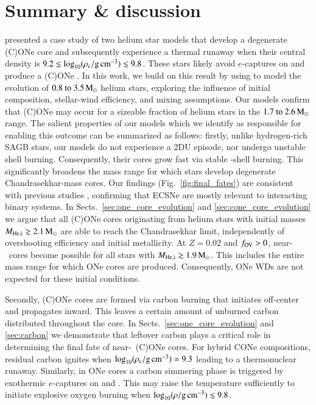 \documentclass[main.tex]{subfiles}
\begin{document}
\section{Summary \& discussion} \label{sec:summary}
 \cite{antoniadis2020}  presented a case study of two helium star models that  develop a 
degenerate (C)ONe core  and subsequently experience a 
thermal runaway when their central density is $9.2 \lesssim \log_{10} (\rho_{\mathrm{c}}/ \mathrm{g\,cm^{-3}}) \lesssim 9.8$. These stars likely avoid $e$-captures on 
 and produce a (C)ONe \ia. 
In this work, we build on this result by using \mesa to model the evolution of $\numrange{0.8}{3.5}\msun$ helium stars, exploring the influence of initial composition, stellar-wind efficiency, and mixing assumptions. 
Our models confirm that (C)ONe \ias may occur for a sizeable fraction of  helium stars in the $\numrange{1.7}{2.6}\msun$ range. The salient properties of our models which we identify as responsible for enabling this outcome can be summarized as follows: firstly, unlike hydrogen-rich SAGB stars, our models do not experience a 2DU episode, nor undergo unstable shell burning. Consequently, their cores grow fast via stable -shell burning. This significantly broadens the mass range for which stars develop degenerate Chandrasekhar-mass cores. Our findings (Fig.~\ref{fig:final_fates}) are consistent with previous studies  \citep[e.g.,][]{Podsiadlowski:2003py,Poelarends:2007ip,Poelarends:2017dua}, confirming that ECSNe are mostly relevant to interacting binary systems. In Sects.~\ref{sec:one_core_evolution} and \ref{sec:cone_core_evolution} we argue that all (C)ONe cores originating from helium stars with initial masses $M_{\rm He, i}\gtrsim 2.1\mathrm{\,M_\odot}$ are able to reach the Chandrasekhar limit, independently of overshooting efficiency and initial metallicity. At $Z=0.02$ and $f_{\rm OV}>0$, near-\mch\ cores become possible for all stars with  $M_{\rm He, i}\gtrsim 1.9\mathrm{\,M_\odot}$. This includes the entire mass range for which ONe cores are produced. Consequently, ONe WDs are not expected for these initial conditions.

Secondly, (C)ONe cores are formed via carbon burning that initiates off-center and propagates inward. This leaves a certain amount of unburned carbon distributed throughout the core.  
In Sects.~\ref{sec:one_core_evolution} and \ref{sec:carbon} we demonstrate that leftover carbon plays a critical role in determining the final fate of near-\mch\ (C)ONe cores. For hybrid CONe compositions, residual carbon ignites when $\log_{10} (\rho_{\mathrm{c}}/ \mathrm{g\,cm^{-3}}) \simeq 9.3$ leading to a thermonuclear runaway. Similarly, in ONe cores a carbon simmering phase is triggered by exothermic $e$-captures on  and . This may raise the temperature sufficiently to initiate explosive oxygen burning when $\log_{10} (\rho/ \mathrm{g\,cm^{-3}}) \lesssim 9.8$. 
\end{document}
